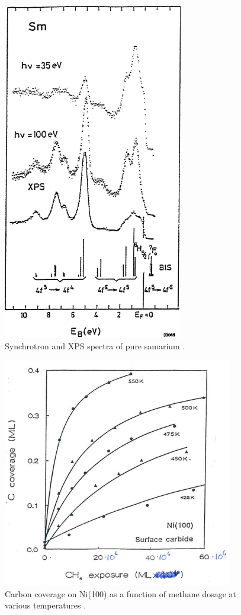 \begin{figure}[h!]
	\begin{center}
	\includegraphics[width=0.7\textwidth]{figures/04_25.png}
	\caption{Synchrotron and XPS spectra of pure samarium \cite{gerken}.}
	\label{fig:smxps}
	\end{center}
\end{figure}

\begin{figure}[h!]
	\begin{center}
	\includegraphics[scale=4]{figures/04_26}
	\caption{Carbon coverage on Ni(100) as a function of methane dosage at various temperatures \cite{chorkendorff2}.}
	\label{fig:ccoverage}
	\end{center}
\end{figure}
